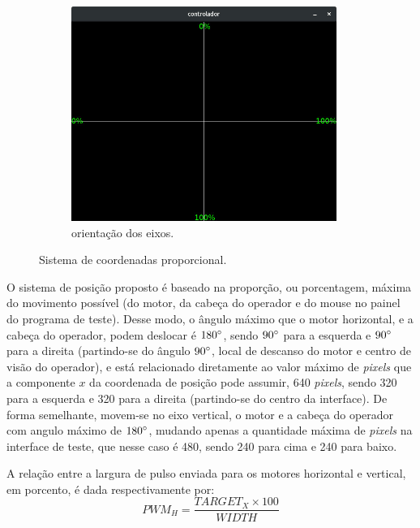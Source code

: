 \begin{figure}[H]
	\begin{subfigure}{.5\textwidth}
		\includegraphics[width=0.95\textwidth]{figuras/controlador-values.jpg}
		\caption{orientação dos eixos.}
		\label{fig:sistcoord}
	\end{subfigure}
	\caption{Sistema de coordenadas proporcional.}
\end{figure}

O sistema de posição proposto é baseado na proporção, ou porcentagem, máxima do movimento possível (do motor, da cabeça do operador e do mouse no painel do programa de teste). Desse modo, o ângulo máximo que o motor horizontal, e a cabeça do operador, podem deslocar é $180\degree$, sendo $90\degree$ para a esquerda e $90\degree$ para a direita (partindo-se do ângulo $90\degree$, local de descanso do motor e centro de visão do operador), e está relacionado diretamente ao valor máximo de \textit{pixels} que a componente $x$ da coordenada de posição pode assumir, 640 \textit{pixels}, sendo 320 para a esquerda e 320 para a direita (partindo-se do centro da interface). De forma semelhante, movem-se no eixo vertical, o motor e a cabeça do operador com angulo máximo de $180\degree$, mudando apenas a quantidade máxima de \textit{pixels} na interface de teste, que nesse caso é 480, sendo 240 para cima e 240 para baixo.\par
A relação entre a largura de pulso enviada para os motores horizontal e vertical, em porcento, é dada respectivamente por:
\begin{equation}
	PWM_H = \frac{TARGET_X \times 100}{WIDTH}
	\label{eq:pwm_screen_h}
\end{equation}

